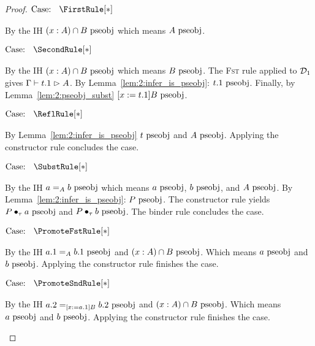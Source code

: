 \begin{proof}
    $\text{Case: }\begin{array}{c} \FirstRule[*] \end{array}$
    \begin{proofcase}
        By the IH $(x : A) \cap B ~\mbox{\normalfont pseobj}$ which means $A~\mbox{\normalfont pseobj}$.
    \end{proofcase}

    $\text{Case: }\begin{array}{c} \SecondRule[*] \end{array}$
    \begin{proofcase}
        By the IH $(x : A) \cap B ~\mbox{\normalfont pseobj}$ which means $B~\mbox{\normalfont pseobj}$.
        The \textsc{Fst} rule applied to $\mathcal{D}_{1}$ gives $\Gamma \vdash t.1 \vartriangleright A$.
        By Lemma~\ref{lem:2:infer_is_pseobj}: $t.1~\mbox{\normalfont pseobj}$.
        Finally, by Lemma~\ref{lem:2:pseobj_subst} $[x := t.1]B~\mbox{\normalfont pseobj}$.
    \end{proofcase}

    $\text{Case: }\begin{array}{c} \ReflRule[*] \end{array}$
    \begin{proofcase}
        By Lemma~\ref{lem:2:infer_is_pseobj} $t~\mbox{\normalfont pseobj}$ and $A~\mbox{\normalfont pseobj}$.
        Applying the constructor rule concludes the case.
    \end{proofcase}

    $\text{Case: }\begin{array}{c} \SubstRule[*] \end{array}$
    \begin{proofcase}
        By the IH $a =_A b~\mbox{\normalfont pseobj}$ which means $a~\mbox{\normalfont pseobj}$, $b~\mbox{\normalfont pseobj}$, and $A~\mbox{\normalfont pseobj}$.
        By Lemma~\ref{lem:2:infer_is_pseobj}: $P~\mbox{\normalfont pseobj}$.
        The constructor rule yields $P \bullet_{\tau} a~\mbox{\normalfont pseobj}$ and $P \bullet_{\tau} b~\mbox{\normalfont pseobj}$.
        The binder rule concludes the case.
    \end{proofcase}

    $\text{Case: }\begin{array}{c} \PromoteFstRule[*] \end{array}$
    \begin{proofcase}
        By the IH $a.1 =_A b.1~\mbox{\normalfont pseobj}$ and $(x : A) \cap B~\mbox{\normalfont pseobj}$. Which means $a~\mbox{\normalfont pseobj}$ and $b~\mbox{\normalfont pseobj}$.
        Applying the constructor rule finishes the case.
    \end{proofcase}

    $\text{Case: }\begin{array}{c} \PromoteSndRule[*] \end{array}$
    \begin{proofcase}
        By the IH $a.2 =_{[x := a.1]B} b.2~\mbox{\normalfont pseobj}$ and $(x : A) \cap B~\mbox{\normalfont pseobj}$. Which means $a~\mbox{\normalfont pseobj}$ and $b~\mbox{\normalfont pseobj}$.
        Applying the constructor rule finishes the case.
    \end{proofcase}


\end{proof}

